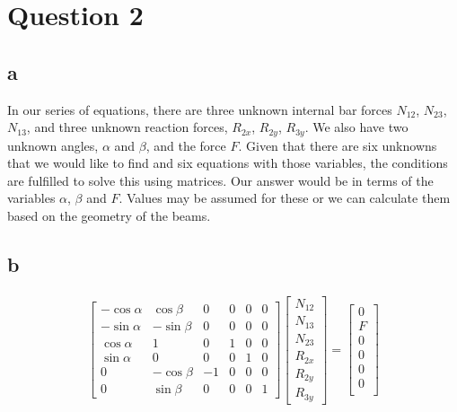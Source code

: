 \documentclass[11pt]{article}
\numberwithin{equation}{section}
\begin{document}
\section{Question 2}
\subsection{a}
In our series of equations, there are three unknown internal bar forces $N_{12}$, $N_{23}$, $N_{13}$, and three unknown reaction forces, $R_{2x}$, $R_{2y}$, $R_{3y}$. We also have two unknown angles, $\alpha$ and $\beta$, and the force $F$. Given that there are six unknowns that we would like to find and six equations with those variables, the conditions are fulfilled to solve this using matrices. Our answer would be in terms of the variables $\alpha$, $\beta$ and $F$. Values may be assumed for these or we can calculate them based on the geometry of the beams. 
\subsection{b}
\begin{gather}
    \begin{bmatrix}
        -\cos \alpha & \cos \beta & 0 & 0 & 0 & 0\\
        -\sin \alpha & -\sin \beta & 0 & 0 & 0 &0\\
        \cos \alpha & 1 & 0 & 1 & 0 & 0\\
        \sin \alpha & 0 & 0& 0 & 1 & 0\\
        0 & -\cos \beta & -1 & 0 & 0 & 0\\
        0 & \sin \beta & 0 & 0 & 0 & 1
    \end{bmatrix} \begin{bmatrix}
        N_{12}\\
        N_{13}\\
        N_{23}\\
        R_{2x}\\
        R_{2y}\\
        R_{3y}        
    \end{bmatrix} = \begin{bmatrix}
        0\\
        F\\
        0\\
        0\\
        0\\
        0\\
    \end{bmatrix}
\end{gather}
\end{document}

